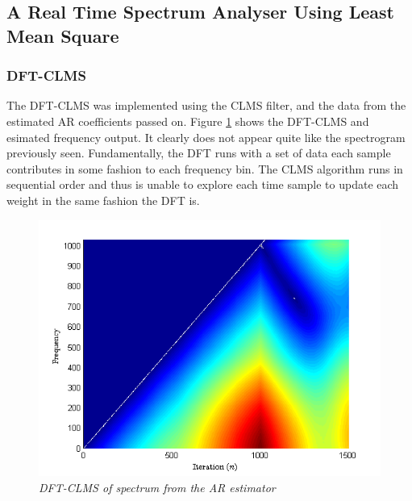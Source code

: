 \documentclass[./main.tex]{subfiles}
\begin{document}
\subsection{A Real Time Spectrum Analyser Using Least Mean Square}

\subsubsection{DFT-CLMS}

The DFT-CLMS was implemented using the CLMS filter, and the data from the estimated AR coefficients passed on. Figure \ref{fig:4_3_c} shows the DFT-CLMS and esimated frequency output. It clearly does not appear quite like the spectrogram previously seen. Fundamentally, the DFT runs with a set of data each sample contributes in some fashion to each frequency bin. The CLMS algorithm runs in sequential order and thus is unable to explore each time sample to update each weight in the same fashion the DFT is.

\begin{figure}[h]
	\centering 
	\includegraphics[scale=1]{fig/4/4_3_c.png}
	\caption{\textit{DFT-CLMS of spectrum from the AR estimator}}
	\label{fig:4_3_c}
\end{figure}
\end{document}
